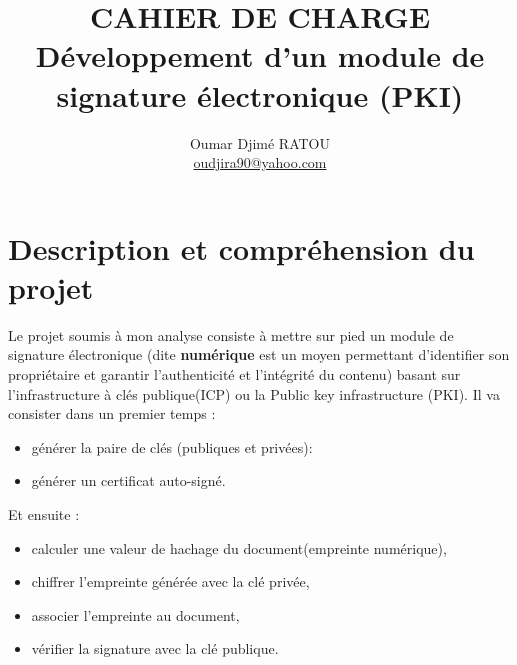 \documentclass[12pt,a4paper]{article}
\begin{document}
\title{
	{\textbf{{\Huge CAHIER DE CHARGE}}}\\
	\vspace*{2cm}
	{Développement d'un module de signature électronique (PKI)}
}

\author{Oumar Djimé RATOU\\
{\small \href{mailto:oudjira90@yahoo.com}{oudjira90@yahoo.com}}}
 

\maketitle


\newpage
\tableofcontents
\newpage

\listoffigures
\newpage
\listoftables
\newpage


\section{Description et compréhension du projet}

	Le projet soumis à mon analyse consiste à mettre sur pied un module de signature électronique (dite \textbf{numérique} est un moyen permettant d'identifier son propriétaire et garantir l'authenticité et l'intégrité du contenu)  basant sur  l'infrastructure à clés publique(ICP) ou la Public key infrastructure (PKI). Il va consister  dans un premier temps :\\
	\begin{itemize}
		\item générer la paire de clés (publiques et privées):
		\item générer un certificat auto-signé.\\
\end{itemize}		
	   Et ensuite :\\
	\begin{itemize}
	\item calculer une valeur de hachage du document(empreinte numérique),
	\item chiffrer l'empreinte générée avec la clé privée,
	\item associer l'empreinte au document,
	\item vérifier la signature avec la clé publique.\\
\end{itemize}		   
	
\end{document}
